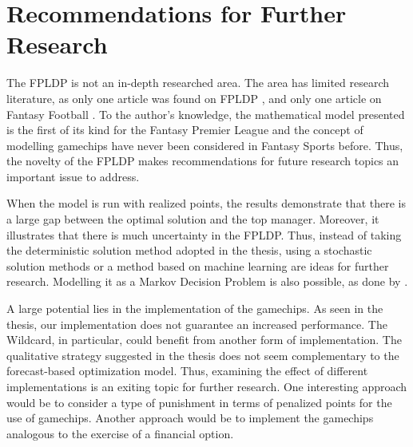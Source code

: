 
\chapter{Recommendations for Further Research}

The FPLDP is not an in-depth researched area. The area has limited research literature, as only one article was found on FPLDP \citep{Matthews}, and only one article on Fantasy Football \citep{Bonomo}. To the author's knowledge, the mathematical model presented is the first of its kind for the Fantasy Premier League and the concept of modelling gamechips have never been considered in Fantasy Sports before. Thus, the novelty of the FPLDP makes recommendations for future research topics an important issue to address.

\newpar

When the model is run with realized points, the results demonstrate that there is a large gap between the optimal solution and the top manager. Moreover, it illustrates that there is much uncertainty in the FPLDP. Thus, instead of taking the deterministic solution method adopted in the thesis, using a stochastic solution methods or a method based on machine learning are ideas for further research. Modelling it as a Markov Decision Problem is also possible, as done by \cite{Matthews}.
\newpar

A large potential lies in the implementation of the gamechips. As seen in the thesis, our implementation does not guarantee an increased performance. The Wildcard, in particular, could benefit from another form of implementation. The qualitative strategy suggested in the thesis does not seem complementary to the forecast-based optimization model. Thus, examining the effect of different implementations is an exiting topic for further research. One interesting approach would be to consider a type of punishment in terms of penalized points for the use of gamechips. Another approach would be to implement the gamechips analogous to the exercise of a financial option. 

\newpar

